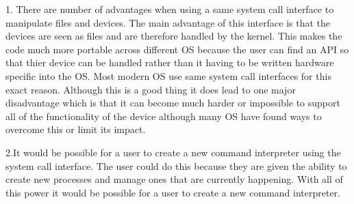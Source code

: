 \documentclass{article}
\begin{document}
1. There are number of advantages when using a same system call interface to manipulate files and devices.  The main advantage of this interface is that 
the devices are seen as files and are therefore handled by the kernel.  This makes the code much more portable across different OS because the user can find
an API so that thier device can be handled rather than it having to be written hardware specific into the OS.  Most modern OS use same system call interfaces
for this exact reason.  Although this is a good thing it does lead to one major disadvantage which is that it can become much harder or impossible to support
all of the functionality of the device although many OS have found ways to overcome this or limit its impact.

2.It would be possible for a user to create a new command interpreter using the system call interface.  The user could do this because they are given the ability
to create new processes and manage ones that are currently happening.  With all of this power it would be possible for a user to create a new command interpreter.
\end{document}
